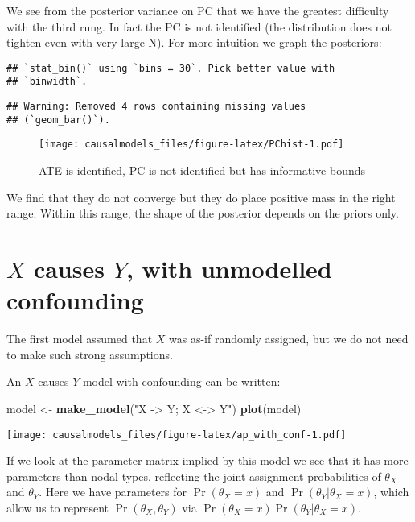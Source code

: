 \documentclass[
  12pt,
]{book}
\newenvironment{Shaded}{\begin{snugshade}}{\end{snugshade}}
\newcommand{\FunctionTok}[1]{\textcolor[rgb]{0.13,0.29,0.53}{\textbf{#1}}}
\newcommand{\NormalTok}[1]{#1}
\newcommand{\OtherTok}[1]{\textcolor[rgb]{0.56,0.35,0.01}{#1}}
\newcommand{\StringTok}[1]{\textcolor[rgb]{0.31,0.60,0.02}{#1}}
\begin{document}
We see from the posterior variance on PC that we have the greatest difficulty with the third rung. In fact the PC is not identified (the distribution does not tighten even with very large N). For more intuition we graph the posteriors:

\begin{verbatim}
## `stat_bin()` using `bins = 30`. Pick better value with
## `binwidth`.
\end{verbatim}

\begin{verbatim}
## Warning: Removed 4 rows containing missing values
## (`geom_bar()`).
\end{verbatim}

\begin{figure}
\centering
\texttt{[image: causalmodels\_files/figure-latex/PChist-1.pdf]}
\caption{\label{fig:PChist}ATE is identified, PC is not identified but has informative bounds}
\end{figure}

We find that they do not converge but they do place positive mass in the right range. Within this range, the shape of the posterior depends on the priors only.

\hypertarget{x-causes-y-with-unmodelled-confounding}{%
\section{\texorpdfstring{\(X\) causes \(Y\), with unmodelled confounding}{X causes Y, with unmodelled confounding}}\label{x-causes-y-with-unmodelled-confounding}}

The first model assumed that \(X\) was as-if randomly assigned, but we do not need to make such strong assumptions.

An \(X\) causes \(Y\) model with confounding can be written:

\begin{Shaded}
\begin{Highlighting}[]
\NormalTok{model }\OtherTok{\textless{}{-}} \FunctionTok{make\_model}\NormalTok{(}\StringTok{"X {-}\textgreater{} Y; X \textless{}{-}\textgreater{} Y"}\NormalTok{) }
\FunctionTok{plot}\NormalTok{(model)}
\end{Highlighting}
\end{Shaded}

\texttt{[image: causalmodels\_files/figure-latex/ap\_with\_conf-1.pdf]}

If we look at the parameter matrix implied by this model we see that it has more parameters than nodal types, reflecting the joint assignment probabilities of \(\theta_X\) and \(\theta_Y\). Here we have parameters for \(\Pr(\theta_X=x)\) and \(\Pr(\theta_Y |\theta_X=x)\), which allow us to represent \(\Pr(\theta_X, \theta_Y)\) via \(\Pr(\theta_X=x)\Pr(\theta_Y |\theta_X=x)\).
\end{document}
